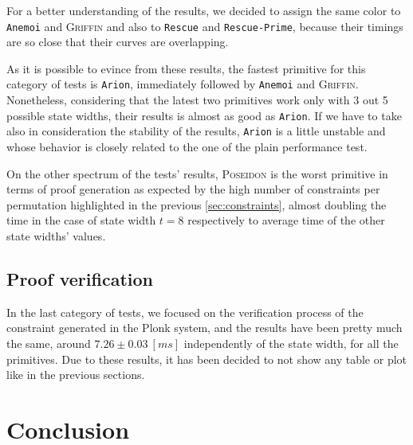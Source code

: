 \documentclass[12pt, a4paper]{report}
\begin{document}
For a better understanding of the results, we decided to assign the same color to \texttt{Anemoi} and \textsc{Griffin} and also to \texttt{Rescue} and \texttt{Rescue-Prime}, because their timings are so close that their curves are overlapping.

As it is possible to evince from these results, the fastest primitive for this category of tests is \texttt{Arion}, immediately followed by \texttt{Anemoi} and \textsc{Griffin}.
Nonetheless, considering that the latest two primitives work only with 3 out 5 possible state widths, their results is almost as good as \texttt{Arion}.
If we have to take also in consideration the stability of the results, \texttt{Arion} is a little unstable and whose behavior is closely related to the one of the plain performance test.

On the other spectrum of the tests' results, \textsc{Poseidon} is the worst primitive in terms of proof generation as expected by the high number of constraints per permutation highlighted in the previous \autoref{sec:constraints}, almost doubling the time in the case of state width $t = 8$ respectively to average time of the other state widths' values.

\section{Proof verification}\label{sec:proofver}

In the last category of tests, we focused on the verification process of the constraint generated in the Plonk system, and the results have been pretty much the same, around $7.26\pm0.03\ [ms]$ independently of the state width, for all the primitives.
Due to these results, it has been decided to not show any table or plot like in the previous sections.

\chapter{Conclusion}\label{chap:conclusion}
\end{document}
